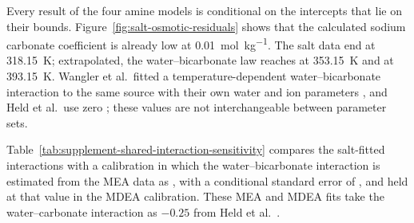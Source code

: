 \documentclass[a4paper,11pt]{article}
\begin{document}
Every result of the four amine models is conditional on the  intercepts that lie on their bounds.
Figure~\ref{fig:salt-osmotic-residuals} shows that the calculated sodium carbonate coefficient is already low at \SI{0.01}{\mole\per\kilogram}.
The salt data end at \SI{318.15}{\kelvin}; extrapolated, the water--bicarbonate law reaches  at \SI{353.15}{\kelvin} and  at \SI{393.15}{\kelvin}.
Wangler et al.\ fitted a temperature-dependent water--bicarbonate interaction to the same source with their own water and ion parameters \cite{Wangler2018}, and Held et al.\ use zero \cite{Held2014}; these values are not interchangeable between parameter sets.

Table~\ref{tab:supplement-shared-interaction-sensitivity} compares the salt-fitted interactions with a calibration in which the water--bicarbonate interaction is estimated from the MEA data as , with a conditional standard error of , and held at that value in the MDEA calibration. These MEA and MDEA fits take the water--carbonate interaction as $-0.25$ from Held et al.\ \cite{Held2014}.
\end{document}
